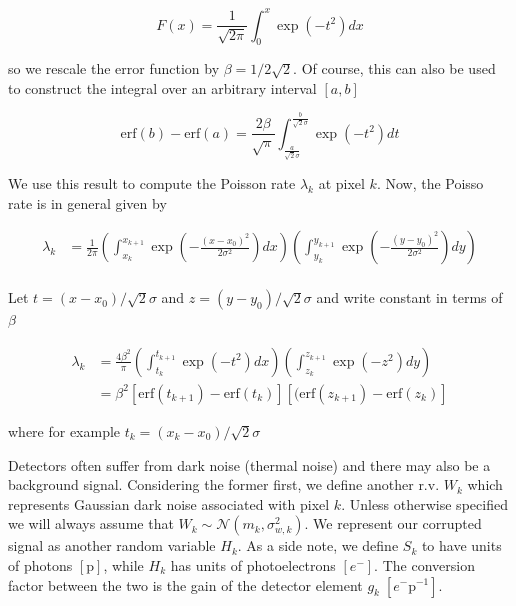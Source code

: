 \documentclass{ucetd}
\begin{document}
\begin{equation*}
F(x) = \frac{1}{\sqrt{2\pi}}\int_{0}^{x} \exp(-t^{2})dx
\end{equation*}

so we rescale the error function by $\beta = 1/2\sqrt{2}$. Of course, this can also be used to construct the integral over an arbitrary interval $[a,b]$

\begin{equation*}
\mathrm{erf}(b) - \mathrm{erf}(a) = \frac{2\beta}{\sqrt{\pi}}\int_{\frac{a}{\sqrt{2}\sigma}}^{\frac{b}{\sqrt{2}\sigma}} \exp(-t^{2})dt
\end{equation*}

We use this result to compute the Poisson rate $\lambda_{k}$ at pixel $k$. Now, the Poisso rate is in general given by

\begin{align*}
\lambda_{k} &= \frac{1}{2\pi}\left(\int_{x_{k}}^{x_{k+1}}\exp\left(-\frac{(x-x_{0})^{2}}{2\sigma^{2}}\right)dx\right)\left(\int_{y_{k}}^{y_{k+1}}\exp\left(-\frac{(y-y_{0})^{2}}{2\sigma^{2}}\right)dy\right)\\
\end{align*}

Let $t = (x-x_{0})/\sqrt{2}\sigma$ and $z = (y-y_{0})/\sqrt{2}\sigma$ and write constant in terms of $\beta$

\begin{align*}
\lambda_{k} &= \frac{4\beta^{2}}{\pi}\left(\int_{t_{k}}^{t_{k+1}}\exp\left(-t^{2}\right)dx\right)\left(\int_{z_{k}}^{z_{k+1}}\exp\left(-z^{2}\right)dy\right)\\
&= \beta^{2}\left[\mathrm{erf}(t_{k+1}) - \mathrm{erf}(t_{k})\right]\left[(\mathrm{erf}(z_{k+1}) - \mathrm{erf}(z_{k})\right]
\end{align*}

where for example $t_{k} = (x_{k}-x_{0})/\sqrt{2}\sigma$


Detectors often suffer from dark noise (thermal noise) and there may also be a background signal. Considering the former first, we define another r.v. $W_{k}$ which represents Gaussian dark noise associated with pixel $k$. Unless otherwise specified we will always assume that $W_{k} \sim \mathcal{N}(m_{k},\sigma_{w,k}^{2})$. We represent our corrupted signal as another random variable $H_{k}$. As a side note, we define $S_{k}$ to have units of photons $[\mathrm{p}]$, while $H_{k}$ has units of photoelectrons $[e^{-}]$. The conversion factor between the two is the gain of the detector element $g_{k}\; [e^{-}\mathrm{p}^{-1}]$.
\end{document}
